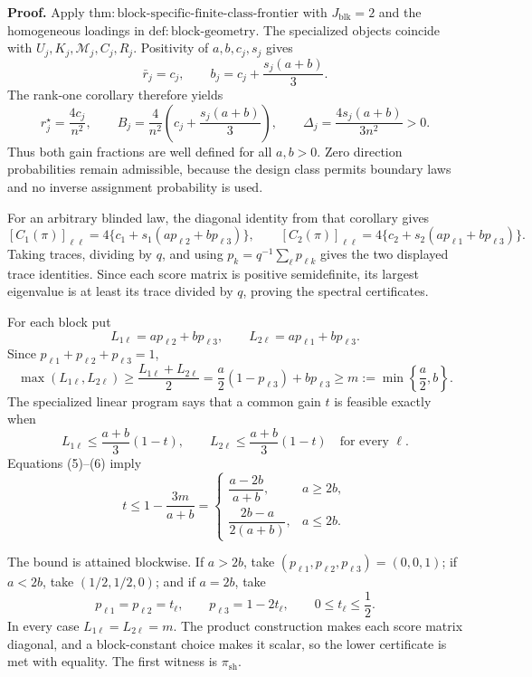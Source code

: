 \textbf{Proof.}
Apply \(\mathrm{thm:block\text{-}specific\text{-}finite\text{-}class\text{-}frontier}\) with \(J_{\mathrm{blk}}=2\) and the homogeneous loadings in \(\mathrm{def:block\text{-}geometry}\). The specialized objects coincide with \(U_j,K_j,\mathcal M_j,C_j,R_j\). Positivity of \(a,b,c_j,s_j\) gives
\[
\bar r_j=c_j,
\qquad
b_j=c_j+\frac{s_j(a+b)}3.
\tag{1}
\]
The rank-one corollary therefore yields
\[
r_j^\star=\frac{4c_j}{n^2},
\qquad
B_j=\frac4{n^2}\left(c_j+\frac{s_j(a+b)}3\right),
\qquad
\Delta_j=\frac{4s_j(a+b)}{3n^2}>0.
\tag{2}
\]
Thus both gain fractions are well defined for all \(a,b>0\). Zero direction probabilities remain admissible, because the design class permits boundary laws and no inverse assignment probability is used.

For an arbitrary blinded law, the diagonal identity from that corollary gives
\[
[C_1(\pi)]_{\ell\ell}
=4\{c_1+s_1(ap_{\ell2}+bp_{\ell3})\},
\qquad
[C_2(\pi)]_{\ell\ell}
=4\{c_2+s_2(ap_{\ell1}+bp_{\ell3})\}.
\tag{3}
\]
Taking traces, dividing by \(q\), and using \(p_k=q^{-1}\sum_\ell p_{\ell k}\) gives the two displayed trace identities. Since each score matrix is positive semidefinite, its largest eigenvalue is at least its trace divided by \(q\), proving the spectral certificates.

For each block put
\[
L_{1\ell}=ap_{\ell2}+bp_{\ell3},
\qquad
L_{2\ell}=ap_{\ell1}+bp_{\ell3}.
\tag{4}
\]
Since \(p_{\ell1}+p_{\ell2}+p_{\ell3}=1\),
\[
\max(L_{1\ell},L_{2\ell})
\ge\frac{L_{1\ell}+L_{2\ell}}2
=\frac a2(1-p_{\ell3})+bp_{\ell3}
\ge m:=\min\left\{\frac a2,b\right\}.
\tag{5}
\]
The specialized linear program says that a common gain \(t\) is feasible exactly when
\[
L_{1\ell}\le\frac{a+b}{3}(1-t),
\qquad
L_{2\ell}\le\frac{a+b}{3}(1-t)
\quad\text{for every }\ell.
\tag{6}
\]
Equations (5)--(6) imply
\[
t\le1-\frac{3m}{a+b}
=
\begin{cases}
\dfrac{a-2b}{a+b},&a\ge2b,\\[6pt]
\dfrac{2b-a}{2(a+b)},&a\le2b.
\end{cases}
\tag{7}
\]

The bound is attained blockwise. If \(a>2b\), take \((p_{\ell1},p_{\ell2},p_{\ell3})=(0,0,1)\); if \(a<2b\), take \((1/2,1/2,0)\); and if \(a=2b\), take
\[
p_{\ell1}=p_{\ell2}=t_\ell,
\qquad
p_{\ell3}=1-2t_\ell,
\qquad
0\le t_\ell\le\frac12.
\tag{8}
\]
In every case \(L_{1\ell}=L_{2\ell}=m\). The product construction makes each score matrix diagonal, and a block-constant choice makes it scalar, so the lower certificate is met with equality. The first witness is \(\pi_{\mathrm{sh}}\).

